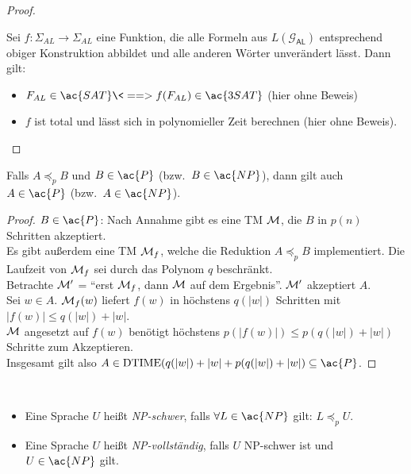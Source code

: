 \begin{proof}
\begin{enumerate}
\end{enumerate}

Sei $f:\Sigma_{AL}\rightarrow\Sigma_{AL}$ eine Funktion, die alle Formeln aus $L(\mathcal{G}_\mathsf{AL})$ entsprechend obiger Konstruktion abbildet und alle anderen Wörter unverändert lässt. Dann gilt:
\begin{itemize}
 \item $F_{AL}\in \ac{SAT} \<==> f(F_{AL})\in \ac{3SAT}$ (hier ohne Beweis)
 \item $f$ ist total und lässt sich in polynomieller Zeit berechnen (hier ohne Beweis).
 \qedhere
\end{itemize}
\end{proof}



\begin{lemma}\label{lem:A<B + BinP => AinP}
	Falls $A\preceq_p B$ und $B\in \ac{P}$ (bzw.\ $B\in \ac{NP}$), dann gilt auch $A\in \ac{P}$ (bzw.\ $A\in \ac{NP}$).
\end{lemma}
\begin{proof}
	$B\in \ac{P}$: Nach Annahme gibt es eine \ac{TM} $\mathcal{M}$, die $B$ in $p(n)$ Schritten akzeptiert.\\
	Es gibt außerdem eine \ac{TM} $\mathcal{M}_f$, welche die Reduktion $A\preceq_p B$ implementiert.
	Die Laufzeit von $\mathcal{M}_f$ sei durch das Polynom $q$ beschränkt.\\
	Betrachte $\mathcal{M}'$ = "`erst $\mathcal{M}_f$, dann $\mathcal{M}$ auf dem Ergebnis"'.
	$\mathcal{M}'$ akzeptiert $A$.\\
	Sei $w\in A$.
	$\mathcal{M}_f(w)$ liefert $f(w)$ in höchstens $q(|w|)$ Schritten mit $|f(w)|\leq q(|w|) + |w|$.\\
	$\mathcal{M}$ angesetzt auf $f(w)$ benötigt höchstens $p(|f(w)|)\leq p(q(|w|) + |w|)$ Schritte zum Akzeptieren.\\
	Insgesamt gilt also $A\in \DTIME(q(|w|) + |w|+p(q(|w|) + |w|)\subseteq \ac{P}$.
\end{proof}



\begin{Def}[name={[\ac{NP}-schwer und \ac{NP}-vollständig]}]\
	\begin{itemize}
	\item Eine Sprache $U$ heißt \emph{\ac{NP}-schwer}, falls $\forall L\in \ac{NP}$ gilt: $L\preceq_p U$.
	\item Eine Sprache $U$ heißt \emph{\ac{NP}-vollständig}, falls $U$ \ac{NP}-schwer ist und $U\in \ac{NP}$ gilt. \qedhere
	\end{itemize}
\end{Def}

